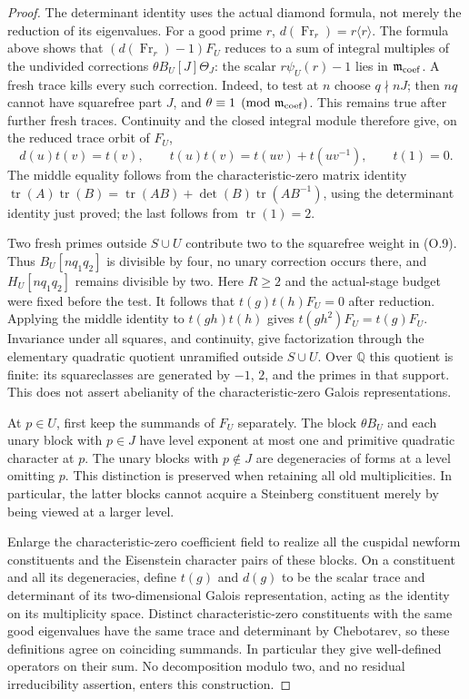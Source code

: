 \documentclass[11pt]{article}
\theoremstyle{definition}
\theoremstyle{remark}
\newcommand{\Q}{\mathbb Q}
\begin{document}
\begin{proof}
The determinant identity uses the actual diamond formula, not merely
the reduction of its eigenvalues. For a good prime $r$,
$d(\operatorname{Fr}_r)=r\langle r\rangle$. The formula above shows
that $(d(\operatorname{Fr}_r)-1)F_U$ reduces to a sum of integral
multiples of the undivided corrections $\theta B_U[J]\Theta_J$:
the scalar $r\psi_U(r)-1$ lies in $\mathfrak m_{\rm coef}$.
A fresh trace kills every such correction. Indeed, to test at $n$
choose $q\nmid nJ$; then $nq$ cannot have squarefree part $J$, and
$\theta\equiv1\pmod{\mathfrak m_{\rm coef}}$. This remains true
after further fresh traces. Continuity and the closed integral
module therefore give, on the reduced trace orbit of $F_U$,
\[
 d(u)t(v)=t(v),\qquad
 t(u)t(v)=t(uv)+t(uv^{-1}),\qquad t(1)=0.
\]
The middle equality follows from the characteristic-zero matrix
identity
$\operatorname{tr}(A)\operatorname{tr}(B)
=\operatorname{tr}(AB)+\det(B)\operatorname{tr}(AB^{-1})$,
using the determinant identity just proved; the last follows from
$\operatorname{tr}(1)=2$.

Two fresh primes outside $S\cup U$ contribute two to the squarefree
weight in (O.9). Thus $B_U[nq_1q_2]$ is divisible by four, no unary
correction occurs there, and $H_U[nq_1q_2]$ remains divisible by two.
Here $R\ge2$ and the actual-stage budget were fixed before the test.
It follows that $t(g)t(h)F_U=0$ after reduction. Applying the middle
identity to $t(gh)t(h)$ gives $t(gh^2)F_U=t(g)F_U$.
Invariance under all squares, and continuity, give factorization
through the elementary quadratic quotient unramified outside
$S\cup U$. Over $\Q$ this quotient is finite: its squareclasses
are generated by $-1$, $2$, and the primes in that support.
This does not assert abelianity of the characteristic-zero
Galois representations.

At $p\in U$, first keep the summands of $F_U$ separately.
The block $\theta B_U$ and each unary block with $p\in J$ have
level exponent at most one and primitive quadratic character at $p$.
The unary blocks with $p\notin J$ are degeneracies of forms at a
level omitting $p$. This distinction is preserved when retaining all
old multiplicities. In particular, the latter blocks cannot acquire a
Steinberg constituent merely by being viewed at a larger level.

Enlarge the characteristic-zero coefficient field to realize all the
cuspidal newform constituents and the Eisenstein character pairs of
these blocks. On a constituent and all its degeneracies, define $t(g)$
and $d(g)$ to be the scalar trace and determinant of its two-dimensional
Galois representation, acting as the identity on its multiplicity
space. Distinct characteristic-zero constituents with the same good
eigenvalues have the same trace and determinant by Chebotarev, so
these definitions agree on coinciding summands. In particular they
give well-defined operators on their sum. No decomposition modulo
two, and no residual irreducibility assertion, enters this construction.


\end{proof}
\end{document}
